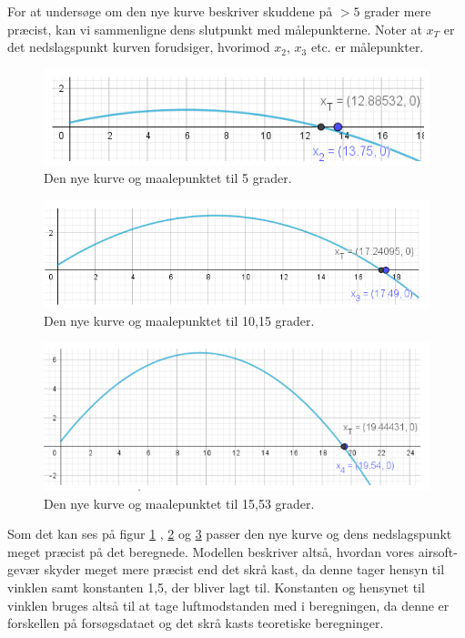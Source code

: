 For at undersøge om den nye kurve beskriver skuddene på $ > 5 $ grader mere præcist, kan vi sammenligne dens slutpunkt med målepunkterne. Noter at $ x_{T} $ er det nedslagspunkt kurven forudsiger, hvorimod $x_{2}$, $x_{3}$ etc. er målepunkter.\\

\begin{figure}[H]
\centering
\includegraphics[scale=0.7]{Billeder/Resultatbehandling6.png}
\caption{Den nye kurve og maalepunktet til 5 grader.}
\label{fig:Resultatbehandling6}
\end{figure}

\begin{figure}[H]
\centering
\includegraphics[scale=0.7]{Billeder/Resultatbehandling7.png}
\caption{Den nye kurve og maalepunktet til 10,15 grader.}
\label{fig:Resultatbehandling7}
\end{figure}

\begin{figure}[H]
\centering
\includegraphics[scale=0.7]{Billeder/Resultatbehandling8.png}
\caption{Den nye kurve og maalepunktet til 15,53 grader.}
\label{fig:Resultatbehandling8}
\end{figure}

Som det kan ses på figur \ref{fig:Resultatbehandling6} , \ref{fig:Resultatbehandling7} og \ref{fig:Resultatbehandling8} passer den nye kurve og dens nedslagspunkt meget præcist på det beregnede. Modellen beskriver altså, hvordan vores airsoft-gevær skyder meget mere præcist end det skrå kast, da denne tager hensyn til vinklen samt konstanten 1,5, der bliver lagt til. Konstanten og hensynet til vinklen bruges altså til at tage luftmodstanden med i beregningen, da denne er forskellen på forsøgsdataet og det skrå kasts teoretiske beregninger.\\[0.5cm]

